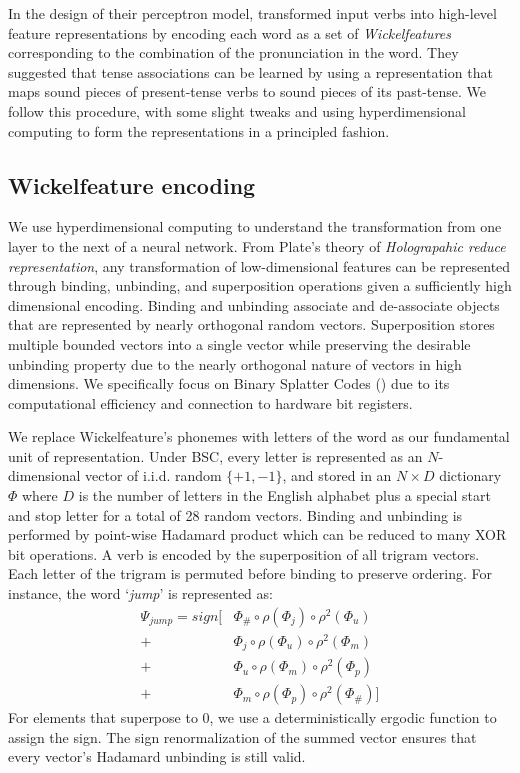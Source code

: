 \documentclass{article}
\begin{document}
In the design of their perceptron model, \citet{Rumelhart1986} transformed input verbs into high-level feature representations by encoding each word as a set of \emph{Wickelfeatures} corresponding to the combination of the pronunciation in the word. They suggested that tense associations can be learned by using a representation that maps sound pieces of present-tense verbs to sound pieces of its past-tense. We follow this procedure, with some slight tweaks and using hyperdimensional computing to form the representations in a principled fashion.

\subsection{Wickelfeature encoding}

We use hyperdimensional computing to understand the transformation from one layer to the next of a neural network. From Plate's theory of \emph{Holograpahic reduce representation}, any transformation of low-dimensional features can be represented through binding, unbinding, and superposition operations given a sufficiently high dimensional encoding. Binding and unbinding associate and de-associate objects that are represented by nearly orthogonal random vectors. Superposition stores multiple bounded vectors into a single vector while preserving the desirable unbinding property due to the nearly orthogonal nature of vectors in high dimensions. We specifically focus on Binary Splatter Codes (\citet{Kanerva1994}) due to its computational efficiency and connection to hardware bit registers.

We replace Wickelfeature's phonemes with letters of the word as our fundamental unit of representation. Under BSC, every letter is represented as an $N$-dimensional vector of i.i.d. random $\{+1, -1\}$, and stored in an $N \times D$ dictionary $\Phi$ where $D$ is the number of letters in the English alphabet plus a special start and stop letter for a total of 28 random vectors. Binding and unbinding is performed by point-wise Hadamard product which can be reduced to many XOR bit operations. A verb is encoded by the superposition of all trigram vectors. Each letter of the trigram is permuted before binding to preserve ordering. For instance, the word `\emph{jump}' is represented as:
\begin{align}
\label{eq:wickel}
\Psi_{jump} = sign [& \Phi_{\#} \circ \rho(\Phi_{j}) \circ \rho^2(\Phi_{u}) \\
      + & \Phi_j \circ \rho(\Phi_u) \circ \rho^2 (\Phi_m) \nonumber \\
        + & \Phi_u \circ \rho(\Phi_m) \circ \rho^2(\Phi_p) \nonumber \\
        + & \Phi_m \circ \rho(\Phi_p) \circ \rho^2 (\Phi_{\#}) ] \nonumber
\end{align}
For elements that superpose to 0, we use a deterministically ergodic function to assign the sign. The sign renormalization of the summed vector ensures that every vector's Hadamard unbinding is still valid. 
\end{document}
